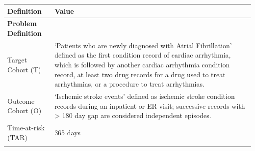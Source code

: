 \documentclass[]{article}
\begin{document}
\begin{longtable}[]{@{}ll@{}}
\toprule
\begin{minipage}[b]{0.42\columnwidth}\raggedright\strut
Definition\strut
\end{minipage} & \begin{minipage}[b]{0.51\columnwidth}\raggedright\strut
Value\strut
\end{minipage}\tabularnewline
\midrule
\endhead
\begin{minipage}[t]{0.42\columnwidth}\raggedright\strut
\textbf{Problem Definition}\strut
\end{minipage} & \begin{minipage}[t]{0.51\columnwidth}\raggedright\strut
\strut
\end{minipage}\tabularnewline
\begin{minipage}[t]{0.42\columnwidth}\raggedright\strut
Target Cohort (T)\strut
\end{minipage} & \begin{minipage}[t]{0.51\columnwidth}\raggedright\strut
`Patients who are newly diagnosed with Atrial Fibrillation' defined as
the first condition record of cardiac arrhythmia, which is followed by
another cardiac arrhythmia condition record, at least two drug records
for a drug used to treat arrhythmias, or a procedure to treat
arrhythmias.\strut
\end{minipage}\tabularnewline
\begin{minipage}[t]{0.42\columnwidth}\raggedright\strut
Outcome Cohort (O)\strut
\end{minipage} & \begin{minipage}[t]{0.51\columnwidth}\raggedright\strut
`Ischemic stroke events' defined as ischemic stroke condition records
during an inpatient or ER visit; successive records with \textgreater{}
180 day gap are considered independent episodes.\strut
\end{minipage}\tabularnewline
\begin{minipage}[t]{0.42\columnwidth}\raggedright\strut
Time-at-risk (TAR)\strut
\end{minipage} & \begin{minipage}[t]{0.51\columnwidth}\raggedright\strut
365 days\strut
\end{minipage}\tabularnewline
\begin{minipage}[t]{0.42\columnwidth}\raggedright\strut
\strut
\end{minipage} & \begin{minipage}[t]{0.51\columnwidth}\raggedright\strut
\strut

\end{minipage}
\end{longtable}
\end{document}

